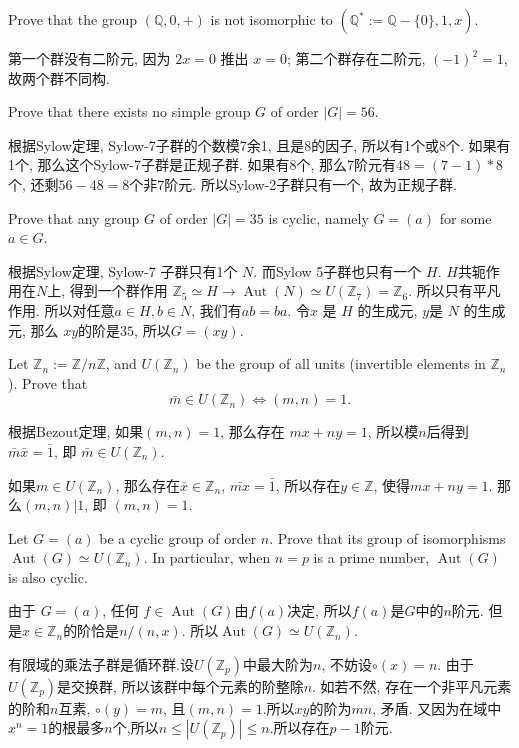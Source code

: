 \documentclass{exam-zh}
\newcommand{\ZZ}{{\mathbb{Z}}}
\newcommand{\QQ}{{\mathbb{Q}}}
\newcommand{\isom}{\simeq}
\DeclareMathOperator{\aut}{Aut}
\begin{document}
\begin{question}
  Prove that the group $(\QQ, 0, +)$ is not isomorphic to $(\QQ^*:=\QQ-\{0\}, 1, x)$.
\end{question}
\begin{solution}
  第一个群没有二阶元, 因为 $2x=0$ 推出 $x=0$; 第二个群存在二阶元, $(-1)^2=1$, 故两个群不同构.
\end{solution}
\begin{question}
  Prove that there exists no simple group $G$ of order $|G|=56$.
\end{question}
\begin{solution}
  根据Sylow定理, Sylow-7子群的个数模7余1, 且是8的因子, 所以有1个或8个. 如果有1个, 那么这个Sylow-7子群是正规子群. 如果有8个, 那么7阶元有$48=(7-1)\ast 8$个, 还剩$56-48=8$个非7阶元. 所以Sylow-2子群只有一个, 故为正规子群.
\end{solution}
\begin{question}
  Prove that any group $G$ of order $|G|=35$ is cyclic, namely $G=(a)$ for some $a\in G$.
\end{question}
\begin{solution}
根据Sylow定理, Sylow-7 子群只有1个 $N$. 而Sylow 5子群也只有一个 $H$. $H$共轭作用在$N$上, 得到一个群作用 $\ZZ_5\isom H\to \aut(N)\isom U(\ZZ_7)=\ZZ_6$. 所以只有平凡作用. 所以对任意$a\in H, b\in N$, 我们有$ab=ba$. 令$x$ 是 $H$ 的生成元, $y$是 $N$ 的生成元, 那么 $xy$的阶是$35$, 所以$G=(xy)$.
\end{solution}
\begin{question}
  Let $\ZZ_n:=\ZZ/n\ZZ$, and $U(\ZZ_n)$ be the group of all units (invertible elements in $\ZZ_n$). Prove that \[\bar{m}\in U(\ZZ_n)\iff (m,n)=1.\]
\end{question}
\begin{solution}
  根据Bezout定理, 如果$(m,n)=1$, 那么存在 $mx+ny=1$, 所以模$n$后得到 $\bar{m}\bar{x}=\bar{1}$, 即 $\bar{m}\in U(\ZZ_n)$.
  
  如果$m\in U(\ZZ_n)$, 那么存在$\bar{x}\in\ZZ_n$, $\bar{mx}=\bar{1}$, 所以存在$y\in \ZZ$, 使得$mx+ny=1$. 那么$(m,n)|1$, 即 $(m,n)=1$.
\end{solution}
\begin{question}
  Let $G=(a)$ be a cyclic group of order $n$. Prove that its group of isomorphisms $\aut(G)\isom U(\ZZ_n)$. In particular, when $n=p$ is a prime number, $\aut(G)$ is also cyclic.
\end{question}
\begin{solution}
  由于 $G=(a)$, 任何 $f\in\aut(G)$由$f(a)$决定, 所以$f(a)$是$G$中的$n$阶元. 但是$x\in\ZZ_n$的阶恰是$n/(n,x)$. 所以$\aut(G)\isom U(\ZZ_n)$.
  
  有限域的乘法子群是循环群.设$U(\ZZ_p)$中最大阶为$n$, 不妨设$\circ(x)=n$. 由于$U(\ZZ_p)$是交换群, 所以该群中每个元素的阶整除$n$. 如若不然, 存在一个非平凡元素的阶和$n$互素, $\circ(y)=m$, 且$(m,n)=1$.所以$xy$的阶为$mn$, 矛盾. 又因为在域中$x^n=1$的根最多$n$个,所以$n\leq |U(\ZZ_p)|\leq n$.所以存在$p-1$阶元.
\end{solution}
\end{document}
